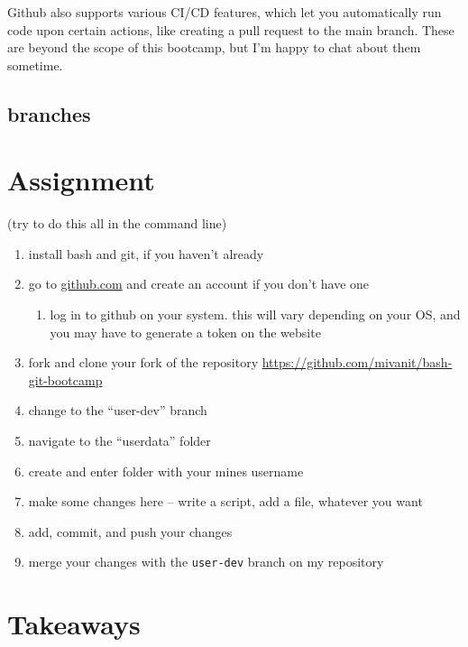 \documentclass[
]{article}
\providecommand{\tightlist}{%
  \setlength{\itemsep}{0pt}\setlength{\parskip}{0pt}}
\begin{document}
Github also supports various CI/CD features, which let you automatically
run code upon certain actions, like creating a pull request to the main
branch. These are beyond the scope of this bootcamp, but I'm happy to
chat about them sometime.

\hypertarget{branches}{%
\subsection{branches}\label{branches}}

\hypertarget{assignment}{%
\section{Assignment}\label{assignment}}

(try to do this all in the command line)

\begin{enumerate}
\def\labelenumi{\arabic{enumi}.}
\tightlist
\item
  install bash and git, if you haven't already
\item
  go to \href{https://github.com}{github.com} and create an account if
  you don't have one

  \begin{enumerate}
  \def\labelenumii{\arabic{enumii}.}
  \setcounter{enumii}{2}
  \tightlist
  \item
    log in to github on your system. this will vary depending on your
    OS, and you may have to generate a token on the website
  \end{enumerate}
\item
  fork and clone your fork of the repository
  \url{https://github.com/mivanit/bash-git-bootcamp}
\item
  change to the ``user-dev'' branch
\item
  navigate to the ``userdata'' folder
\item
  create and enter folder with your mines username
\item
  make some changes here -- write a script, add a file, whatever you
  want
\item
  add, commit, and push your changes
\item
  merge your changes with the \texttt{user-dev} branch on my repository
\end{enumerate}

\hypertarget{takeaways}{%
\section{Takeaways}\label{takeaways}}
\end{document}
